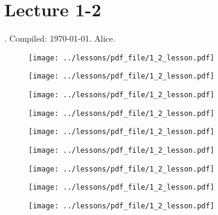 \documentclass[../main/main.tex]{subfiles}
\begin{document}
\section{Lecture 1-2}
 . Compiled:  \today. Alice.
 
\begin{figure}[h!]
\centering
\texttt{[image: ../lessons/pdf\_file/1\_2\_lesson.pdf]}
\end{figure}


\begin{figure}[h!]
\centering
\texttt{[image: ../lessons/pdf\_file/1\_2\_lesson.pdf]}
\end{figure}


\newpage

\begin{figure}[h!]
\centering
\texttt{[image: ../lessons/pdf\_file/1\_2\_lesson.pdf]}
\end{figure}

\begin{figure}[h!]
\centering
\texttt{[image: ../lessons/pdf\_file/1\_2\_lesson.pdf]}
\end{figure}




\newpage

\begin{figure}[h!]
\centering
\texttt{[image: ../lessons/pdf\_file/1\_2\_lesson.pdf]}
\end{figure}

\begin{figure}[h!]
\centering
\texttt{[image: ../lessons/pdf\_file/1\_2\_lesson.pdf]}
\end{figure}



\newpage

\begin{figure}[h!]
\centering
\texttt{[image: ../lessons/pdf\_file/1\_2\_lesson.pdf]}
\end{figure}

\begin{figure}[h!]
\centering
\texttt{[image: ../lessons/pdf\_file/1\_2\_lesson.pdf]}
\end{figure}


\newpage

\begin{figure}[h!]
\centering
\texttt{[image: ../lessons/pdf\_file/1\_2\_lesson.pdf]}
\end{figure}
\end{document}
